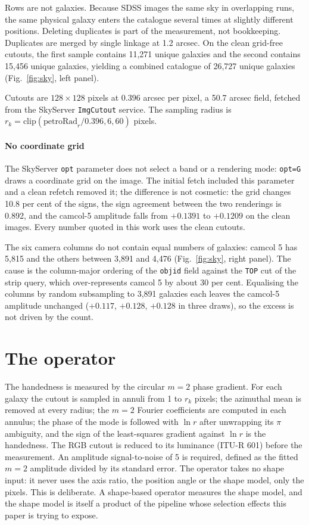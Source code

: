 \documentclass[preprint,12pt,authoryear]{elsarticle}
\begin{document}
Rows are not galaxies. Because SDSS images the same sky in overlapping runs, the same physical
galaxy enters the catalogue several times at slightly different positions. Deleting duplicates is
part of the measurement, not bookkeeping. Duplicates are merged by single linkage at 1.2 arcsec. On
the clean grid-free cutouts, the first sample contains 11,271 unique galaxies and the second
contains 15,456 unique galaxies, yielding a combined catalogue of 26,727 unique galaxies
(Fig.~\ref{fig:sky}, left panel).

Cutouts are $128 \times 128$ pixels at $0.396$ arcsec per pixel, a 50.7 arcsec field, fetched from
the SkyServer \texttt{ImgCutout} service. The sampling radius is
$r_k = \mathrm{clip}(\mathrm{petroRad}_r/0.396, 6, 60)$ pixels.

\paragraph{No coordinate grid} The SkyServer \texttt{opt} parameter does not select a band or a
rendering mode: \texttt{opt=G} draws a coordinate grid on the image. The initial fetch included
this parameter and a clean refetch removed it; the difference is not cosmetic: the grid changes
10.8 per cent of the signs, the sign agreement between the two renderings is 0.892, and the
camcol-5 amplitude falls from $+0.1391$ to $+0.1209$ on the clean images. Every number quoted in
this work uses the clean cutouts.

The six camera columns do not contain equal numbers of galaxies: camcol 5 has 5,815 and the others
between 3,891 and 4,476 (Fig.~\ref{fig:sky}, right panel). The cause is the column-major ordering
of the \texttt{objid} field against the \texttt{TOP} cut of the strip query, which over-represents
camcol 5 by about 30 per cent. Equalising the columns by random subsampling to 3,891 galaxies each
leaves the camcol-5 amplitude unchanged ($+0.117$, $+0.128$, $+0.128$ in three draws), so the
excess is not driven by the count.

\section{The operator}

The handedness is measured by the circular $m=2$ phase gradient. For each galaxy the cutout is
sampled in annuli from 1 to $r_k$ pixels; the azimuthal mean is removed at every radius; the $m=2$
Fourier coefficients are computed in each annulus; the phase of the mode is followed with $\ln r$
after unwrapping its $\pi$ ambiguity, and the sign of the least-squares gradient against $\ln r$ is
the handedness. The RGB cutout is reduced to its luminance (ITU-R 601) before the measurement. An
amplitude signal-to-noise of 5 is required, defined as the fitted $m=2$ amplitude divided by its
standard error. The operator takes no shape input: it never uses the axis ratio, the position angle or
the shape model, only the pixels. This is deliberate. A shape-based operator measures the shape
model, and the shape model is itself a product of the pipeline whose selection effects this paper
is trying to expose.
\end{document}
